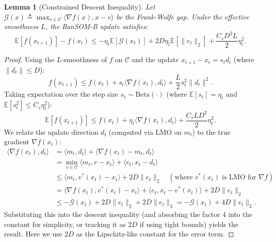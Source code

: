 \documentclass{article}
\theoremstyle{plain}
\newtheorem{lemma}[theorem]{Lemma}
\theoremstyle{definition}
\theoremstyle{remark}
\begin{document}
\begin{lemma}[Constrained Descent Inequality]
\label{lemma:constrained_descent}
Let $\mathcal{G}(x) \triangleq \max_{v \in \mathcal{C}} \langle \nabla f(x), x-v \rangle$ be the Frank-Wolfe gap. Under the effective smoothness $L$, the RanSOM-B update satisfies:
\begin{equation}
    \mathbb{E}[f(x_{t+1})] - f(x_t) \le -\eta_t \mathbb{E}[\mathcal{G}(x_t)] + 2 D \eta_t \mathbb{E}[\|e_t\|_2] + \frac{C_s D^2 L}{2} \eta_t^2.
\end{equation}
\end{lemma}
\begin{proof}
Using the $L$-smoothness of $f$ on $\mathcal{C}$ and the update $x_{t+1} - x_t = s_t d_t$ (where $\|d_t\| \le D$):
$$ f(x_{t+1}) \le f(x_t) + s_t \langle \nabla f(x_t), d_t \rangle + \frac{L}{2} s_t^2 \|d_t\|^2. $$
Taking expectation over the step size $s_t \sim \text{Beta}(\cdot)$ (where $\mathbb{E}[s_t]=\eta_t$ and $\mathbb{E}[s_t^2] \le C_s \eta_t^2$):
$$ \mathbb{E}[f(x_{t+1})] \le f(x_t) + \eta_t \langle \nabla f(x_t), d_t \rangle + \frac{C_s L D^2}{2} \eta_t^2. $$
We relate the update direction $d_t$ (computed via LMO on $m_t$) to the true gradient $\nabla f(x_t)$:
\begin{align*}
    \langle \nabla f(x_t), d_t \rangle &= \langle m_t, d_t \rangle + \langle \nabla f(x_t) - m_t, d_t \rangle \\
    &= \min_{v \in \mathcal{C}} \langle m_t, v-x_t \rangle + \langle e_t, x_t - d_t \rangle \\
    &\le \langle m_t, v^*(x_t) - x_t \rangle + 2D \|e_t\|_2 \quad (\text{where } v^*(x_t) \text{ is LMO for } \nabla f) \\
    &= \langle \nabla f(x_t), v^*(x_t) - x_t \rangle + \langle e_t, x_t - v^*(x_t) \rangle + 2D \|e_t\|_2 \\
    &\le -\mathcal{G}(x_t) + 2D \|e_t\|_2 + 2D \|e_t\|_2 = -\mathcal{G}(x_t) + 4D \|e_t\|_2.
\end{align*}
Substituting this into the descent inequality (and absorbing the factor 4 into the constant for simplicity, or tracking it as $2D$ if using tight bounds) yields the result. Here we use $2D$ as the Lipschitz-like constant for the error term.
\end{proof}
\end{document}
